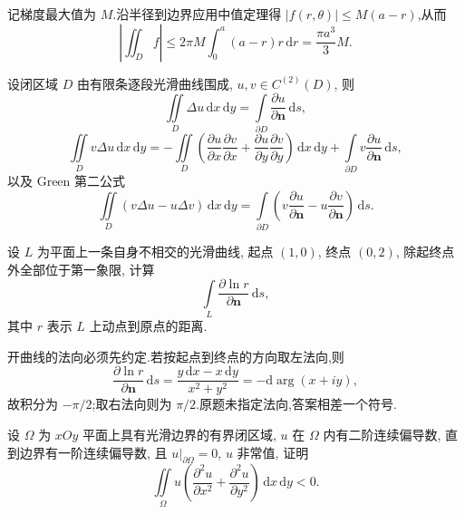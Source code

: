 \begin{solution}
    记梯度最大值为 $M$.沿半径到边界应用中值定理得 $|f(r,\theta)|\leq M(a-r)$,从而
    \[
        \left|\iint_Df\right|\leq2\pi M\int_0^a(a-r)r\,\mathrm{d}r=\dfrac{\pi a^3}{3}M.
    \]
\end{solution}




\begin{theorem}[\markstar]
    设闭区域 $D$ 由有限条逐段光滑曲线围成, $u,v\in C^{(2)}(D)$, 则
    \[
        \iint\limits_D\Delta u\,\mathrm{d}x\,\mathrm{d}y
        =\int\limits_{\partial D}\dfrac{\partial u}{\partial\bm n}\,\mathrm{d}s,
    \]
    \[
        \iint\limits_Dv\Delta u\,\mathrm{d}x\,\mathrm{d}y
        =-\iint\limits_D\left(
        \dfrac{\partial u}{\partial x}\dfrac{\partial v}{\partial x}
        +\dfrac{\partial u}{\partial y}\dfrac{\partial v}{\partial y}
        \right)\,\mathrm{d}x\,\mathrm{d}y
        +\int\limits_{\partial D}v\dfrac{\partial u}{\partial\bm n}\,\mathrm{d}s,
    \]
    以及 Green 第二公式
    \[
        \iint\limits_D(v\Delta u-u\Delta v)\,\mathrm{d}x\,\mathrm{d}y
        =\int\limits_{\partial D}\left(v\dfrac{\partial u}{\partial\bm n}-u\dfrac{\partial v}{\partial\bm n}\right)\,\mathrm{d}s.
    \]
\end{theorem}

\begin{example}
    设 $L$ 为平面上一条自身不相交的光滑曲线, 起点 $(1,0)$, 终点 $(0,2)$, 除起终点外全部位于第一象限, 计算
    \[
        \int\limits_L\dfrac{\partial\ln r}{\partial\bm n}\,\mathrm{d}s,
    \]
    其中 $r$ 表示 $L$ 上动点到原点的距离.
\end{example}
\exampleblank

\begin{solution}
    开曲线的法向必须先约定.若按起点到终点的方向取左法向,则
    \[
        \dfrac{\partial\ln r}{\partial\bm n}\,\mathrm{d}s
        =\dfrac{y\,\mathrm{d}x-x\,\mathrm{d}y}{x^2+y^2}=-\mathrm{d}\arg(x+iy),
    \]
    故积分为 $-\pi/2$;取右法向则为 $\pi/2$.原题未指定法向,答案相差一个符号.
\end{solution}

\begin{example}
    设 $\Omega$ 为 $xOy$ 平面上具有光滑边界的有界闭区域, $u$ 在 $\Omega$ 内有二阶连续偏导数, 直到边界有一阶连续偏导数, 且 $u|_{\partial\Omega}=0$, $u$ 非常值, 证明
    \[
        \iint\limits_\Omega u\left(\dfrac{\partial^2u}{\partial x^2}+\dfrac{\partial^2u}{\partial y^2}\right)\,\mathrm{d}x\,\mathrm{d}y<0.
    \]
\end{example}
\exampleblank

